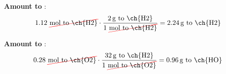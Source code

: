 \begin{enumerate}[label=\numberballmDarkTeal]
\begin{itemize}
            \textbf{Amount to }:
            \begin{equation*}
                1.12\ \cancelred{\unit{\mol}\ \text{to \ch{H2}}} \cdot \dfrac{\qty{2}{\g}\ \text{to \ch{H2}}}{1\ \cancelred{\unit{\mol} \ \text{to \ch{H2}}}} = \qty{2.24}{\g}\ \text{to \ch{H2}}
            \end{equation*}

            \textbf{Amount to }:
            \begin{equation*}
                0.28\ \cancelred{\unit{\mol}\ \text{to \ch{O2}}} \cdot \dfrac{\qty{32}{\g}\ \text{to \ch{H2}}}{1\ \cancelred{\unit{\mol} \ \text{to \ch{O2}}}} = \qty{0.96}{\g}\ \text{to \ch{HO}}
            \end{equation*}
        \end{itemize}
\end{enumerate}


